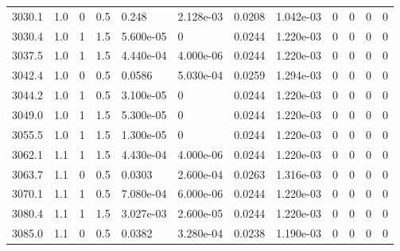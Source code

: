 \documentclass[preview]{standalone}
\begin{document}
{{{{{{{{{{{{{{{{{\begin{tabular}{L{1.2cm}C{1.2cm} C{0.3cm}C{0.5cm} C{1.4cm}C{1.4cm} C{1.4cm}C{1.4cm} C{1.6cm}C{1.6cm} C{1.6cm}C{1.6cm}}
  3030.1  &   1.0  & 0     & 0.5 &  0.248  & 2.128e-03  &  0.0208&   1.042e-03& 0 & 0   &  0 & 0  \\ 
  3030.4  &   1.0  & 1     & 1.5 &  5.600e-05  & 0  &  0.0244&   1.220e-03& 0 & 0   &  0 & 0  \\ 
  3037.5  &   1.0  & 1     & 1.5 &  4.440e-04  & 4.000e-06  &  0.0244&   1.220e-03& 0 & 0   &  0 & 0  \\ 
  3042.4  &   1.0  & 0     & 0.5 &  0.0586  & 5.030e-04  &  0.0259&   1.294e-03& 0 & 0   &  0 & 0  \\ 
  3044.2  &   1.0  & 1     & 0.5 &  3.100e-05  & 0  &  0.0244&   1.220e-03& 0 & 0   &  0 & 0  \\ 
  3049.0  &   1.0  & 1     & 1.5 &  5.300e-05  & 0  &  0.0244&   1.220e-03& 0 & 0   &  0 & 0  \\ 
  3055.5  &   1.0  & 1     & 1.5 &  1.300e-05  & 0  &  0.0244&   1.220e-03& 0 & 0   &  0 & 0  \\ 
  3062.1  &   1.1  & 1     & 1.5 &  4.430e-04  & 4.000e-06  &  0.0244&   1.220e-03& 0 & 0   &  0 & 0  \\ 
  3063.7  &   1.1  & 0     & 0.5 &  0.0303  & 2.600e-04  &  0.0263&   1.316e-03& 0 & 0   &  0 & 0  \\ 
  3070.1  &   1.1  & 1     & 0.5 &  7.080e-04  & 6.000e-06  &  0.0244&   1.220e-03& 0 & 0   &  0 & 0  \\ 
  3080.4  &   1.1  & 1     & 1.5 &  3.027e-03  & 2.600e-05  &  0.0244&   1.220e-03& 0 & 0   &  0 & 0  \\ 
  3085.0  &   1.1  & 0     & 0.5 &  0.0382  & 3.280e-04  &  0.0238&   1.190e-03& 0 & 0   &  0 & 0  \\ 
\hline 
\end{tabular} 

}}}}}}}}}}}}}}}}}
\end{document}
